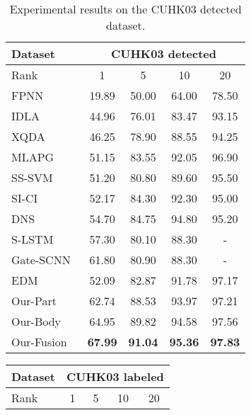 \documentclass[10pt,twocolumn,letterpaper]{article}
\begin{document}
\begin{table}[!tbp]
  \begin{center}
  \scriptsize
    \begin{tabular}{|l|cccc|}
    \hline
    Dataset & \multicolumn{4}{c|}{CUHK03 detected} \\
    \hline
    Rank  & 1     & 5     & 10    & 20 \\
    \hline
    \hline
    FPNN~\cite{LiWeiCVPR14}  & 19.89  & 50.00  & 64.00  & 78.50  \\
    IDLA~\cite{AhmedCVPR15improved}  & 44.96  & 76.01  & 83.47  & 93.15  \\
    XQDA~\cite{LiaoshengcaiCVPR15}  & 46.25  & 78.90  & 88.55  & 94.25  \\
    MLAPG~\cite{LiaoshengcaiICCV15} & 51.15  & 83.55  & 92.05  & 96.90  \\
    SS-SVM~\cite{ZhangCVPR16sample} & 51.20  & 80.80  & 89.60  & 95.50  \\
    SI-CI~\cite{WangfaqiangCVPR16JSC} & 52.17  & 84.30  & 92.30  & 95.00  \\
    DNS~\cite{ZhangLiCVPR16}   & 54.70  & 84.75  & 94.80  & 95.20  \\
    S-LSTM~\cite{Varior2016Siamese} & 57.30  & 80.10  & 88.30  & - \\
Gate-SCNN~\cite{VariorECCV16Gated} & 61.80  & 80.90  & 88.30  & - \\
    EDM~\cite{Shihanlin2016Embedding}   & 52.09  & 82.87  & 91.78  & 97.17  \\
    \hline
    \hline
    Our-Part & 62.74  & 88.53  & 93.97  & 97.21  \\
    Our-Body & 64.95  & 89.82  & 94.58  & 97.56  \\
    Our-Fusion & \textbf{67.99}  & \textbf{91.04}  & \textbf{95.36}  & \textbf{97.83}    \\
    \hline
    \end{tabular}\end{center}
  \vspace{-0.5em}
  \caption{Experimental results on the CUHK03 detected dataset.}
  \label{tab:cuhk03detectedresults}\vspace{-0em}
\end{table}\begin{table}[!tbp]
  \begin{center}
  \scriptsize
    \begin{tabular}{|l|cccc|}
    \hline
    Dataset & \multicolumn{4}{c|}{CUHK03 labeled} \\
    \hline
    Rank  & 1     & 5     & 10    & 20 \\

\end{tabular}
\end{center}
\end{table}
\end{document}
